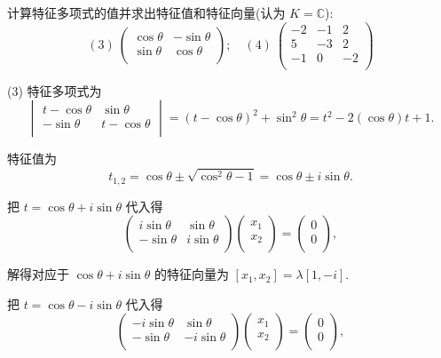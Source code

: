 \documentclass[color=black,device=normal,lang=cn,mode=geye]{elegantnote}
\begin{document}
\begin{example}[2.3.21]\label{exa2.3.21}
    计算特征多项式的值并求出特征值和特征向量(认为 $K=\mathbb{C}$):
    \[(3)\ \begin{pmatrix}
        \cos\theta & -\sin\theta \\
        \sin\theta & \cos\theta \\
    \end{pmatrix};\quad(4)\ \begin{pmatrix}
        -2 & -1 & 2 \\
        5 & -3 & 2 \\
        -1 & 0 & -2 \\
    \end{pmatrix}\]
\end{example}
\begin{solution}
    (3) 特征多项式为
    \[\begin{vmatrix}
        t-\cos\theta & \sin\theta \\
        -\sin\theta & t-\cos\theta \\
    \end{vmatrix}=(t-\cos\theta)^2+\sin^2\theta=t^2-2(\cos\theta)t+1.\]

    特征值为
    \[t_{1,2}=\cos\theta\pm\sqrt{\cos^2\theta-1}=\cos\theta\pm i\sin\theta.\]

    把 $t=\cos\theta+i\sin\theta$ 代入得
    \[\begin{pmatrix}
        i\sin\theta & \sin\theta \\
        -\sin\theta & i\sin\theta \\
    \end{pmatrix}\begin{pmatrix}
        x_1 \\
        x_2 \\
    \end{pmatrix}=\begin{pmatrix}
        0 \\
        0 \\
    \end{pmatrix},\]

    解得对应于 $\cos\theta+i\sin\theta$ 的特征向量为 $[x_1,x_2]=\lambda[1,-i]$.

    把 $t=\cos\theta-i\sin\theta$ 代入得
    \[\begin{pmatrix}
        -i\sin\theta & \sin\theta \\
        -\sin\theta & -i\sin\theta \\
    \end{pmatrix}\begin{pmatrix}
        x_1 \\
        x_2 \\
    \end{pmatrix}=\begin{pmatrix}
        0 \\
        0 \\
    \end{pmatrix},\]


\end{solution}
\end{document}
